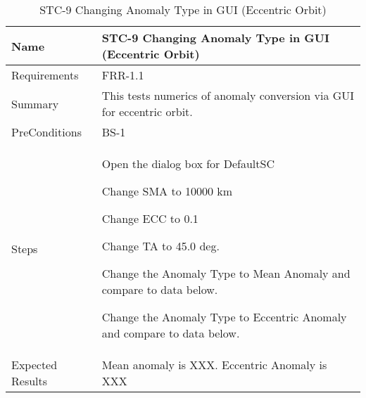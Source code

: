 





\begin{table}[htbp!]
\centering
      \begin{tabular}{|p{1.05 in} |p{4.75 in} |}
      \hline
         \rowcolor[rgb]{0.8,0.8,0.8} Name & STC-9 Changing Anomaly Type in GUI (Eccentric Orbit)\\    \hline
         Requirements & FRR-1.1 \\  \hline
         Summary &
         This tests numerics of anomaly conversion via GUI for eccentric orbit.
         \\  \hline
         PreConditions & BS-1\\
         \hline
         Steps &
         \begin{compactenum}
             \item Open the dialog box for DefaultSC
             \item Change SMA to 10000 km
             \item Change ECC to 0.1
             \item Change TA to 45.0 deg.
             \item Change the Anomaly Type to Mean Anomaly and compare to data below.
             \item Change the Anomaly Type to Eccentric Anomaly and compare to data below.
         \end{compactenum}
         \\ \hline
         Expected Results & Mean anomaly is XXX.  Eccentric Anomaly is XXX \\ \hline
\end{tabular}
      \label{Table: STC-9}
      \caption{STC-9 Changing Anomaly Type in GUI (Eccentric Orbit)}
\end{table} 